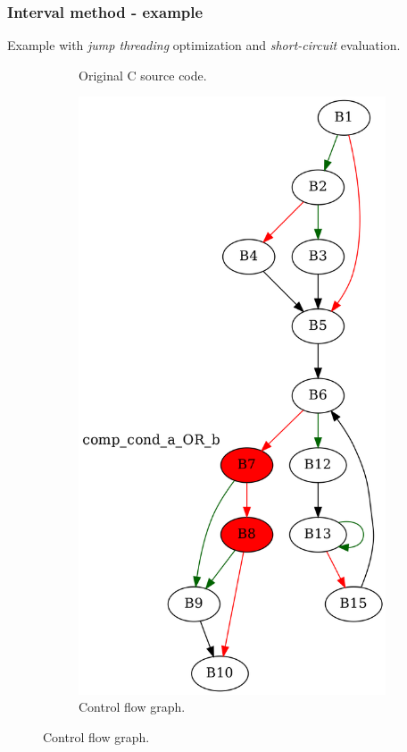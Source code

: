 \documentclass[aspectratio=1610]{beamer}
\begin{document}
\begin{frame}[noframenumbering]
	\frametitle{Interval method - example}
	Example with \textit{jump threading} optimization and \textit{short-circuit} evaluation.
	\begin{figure}[htbp]
		\centering
		\begin{subfigure}[b]{0.30\textwidth}
			\centering
			
			\caption{Original C source code.}
		\end{subfigure}
		\begin{subfigure}[b]{0.50\textwidth}
			\centering
			\includegraphics[height=0.6\paperheight]{inc/methods/interval/example/sample/f_0001a.png}
			\caption{Control flow graph.}
		\end{subfigure}
	\end{figure}
\end{frame}
\end{document}
